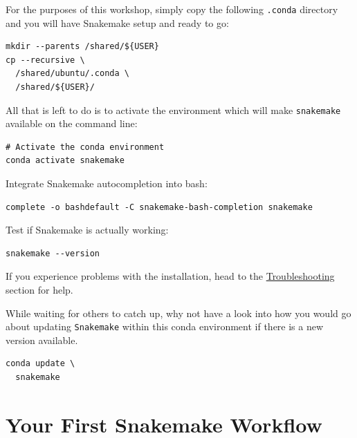 \begin{steps}

For the purposes of this workshop, simply copy the following \texttt{.conda} directory and you
will have Snakemake setup and ready to go:

\begin{lstlisting}
mkdir --parents /shared/${USER}
cp --recursive \
  /shared/ubuntu/.conda \
  /shared/${USER}/
\end{lstlisting}

All that is left to do is to activate the environment which will make \texttt{snakemake} available on the command line:

\begin{lstlisting}
# Activate the conda environment
conda activate snakemake
\end{lstlisting}

Integrate Snakemake autocompletion into bash:

\begin{lstlisting}
complete -o bashdefault -C snakemake-bash-completion snakemake
\end{lstlisting}

Test if Snakemake is actually working:

\begin{lstlisting}
snakemake --version
\end{lstlisting}

\end{steps}

If you experience problems with the installation, head to the \hyperref[sec:snake_trouble]{Troubleshooting} section for help.

\begin{bonus}

While waiting for others to catch up, why not have a look into how you would go about updating \texttt{Snakemake}
within this conda environment if there is a new version available.

\begin{answer}
\begin{lstlisting}
conda update \
  snakemake
\end{lstlisting}
\end{answer}

\end{bonus}


\section{Your First Snakemake Workflow}

